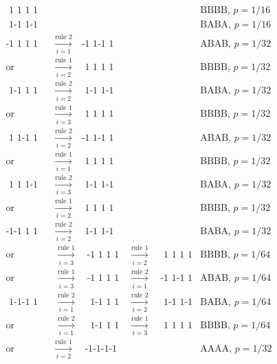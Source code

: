 \documentclass[a4paper]{article}
\begin{document}
 \begin{align*}
     \text{ 1 1 1 1} && \text{BBBB, }p=1/16 \\
     \text{ 1-1 1-1} && \text{BABA, }p=1/16 \\
     \text{-1 1 1 1} & \quad\xrightarrow[i=1]{\text{rule 2}}\quad\text{-1 1-1 1} & \text{ABAB, }p=1/32\\
     \text{or}       & \quad\xrightarrow[i=2]{\text{rule 1}}\quad\text{ 1 1 1 1} & \text{BBBB, }p=1/32\\
     \text{ 1-1 1 1} & \quad\xrightarrow[i=2]{\text{rule 2}}\quad\text{ 1-1 1-1} & \text{BABA, }p=1/32\\
     \text{or}       & \quad\xrightarrow[i=3]{\text{rule 1}}\quad\text{ 1 1 1 1} & \text{BBBB, }p=1/32\\
     \text{ 1 1-1 1} & \quad\xrightarrow[i=2]{\text{rule 2}}\quad\text{-1 1-1 1} & \text{ABAB, }p=1/32\\
     \text{or}       & \quad\xrightarrow[i=1]{\text{rule 1}}\quad\text{ 1 1 1 1} & \text{BBBB, }p=1/32\\
     \text{ 1 1 1-1} & \quad\xrightarrow[i=3]{\text{rule 2}}\quad\text{ 1-1 1-1} & \text{BABA, }p=1/32\\
     \text{or}       & \quad\xrightarrow[i=2]{\text{rule 1}}\quad\text{ 1 1 1 1} & \text{BBBB, }p=1/32\\
     \text{-1-1 1 1} & \quad\xrightarrow[i=2]{\text{rule 2}}\quad\text{ 1-1 1-1} & \text{BABA, }p=1/32\\
     \text{or}       & \quad\xrightarrow[i=3]{\text{rule 1}}\quad\text{-1 1 1 1} \quad\xrightarrow[i=2]{\text{rule 1}}\quad\text{ 1 1 1 1} &\text{BBBB, }p=1/64\\
     \text{or}       & \quad\xrightarrow[i=3]{\text{rule 1}}\quad\text{-1 1 1 1} \quad\xrightarrow[i=1]{\text{rule 2}}\quad\text{-1 1-1 1} &\text{ABAB, }p=1/64\\
     \text{ 1-1-1 1} & \quad\xrightarrow[i=1]{\text{rule 2}}\quad\text{ 1-1 1 1} \quad\xrightarrow[i=2]{\text{rule 2}}\quad\text{ 1-1 1-1} &\text{BABA, }p=1/64\\
     \text{or}       & \quad\xrightarrow[i=1]{\text{rule 2}}\quad\text{ 1-1 1 1} \quad\xrightarrow[i=3]{\text{rule 1}}\quad\text{ 1 1 1 1} &\text{BBBB, }p=1/64\\
     \text{or}       & \quad\xrightarrow[i=2]{\text{rule 1}}\quad\text{ -1-1-1-1} &\text{AAAA, }p=1/32\\
 \end{align*}
\end{document}
